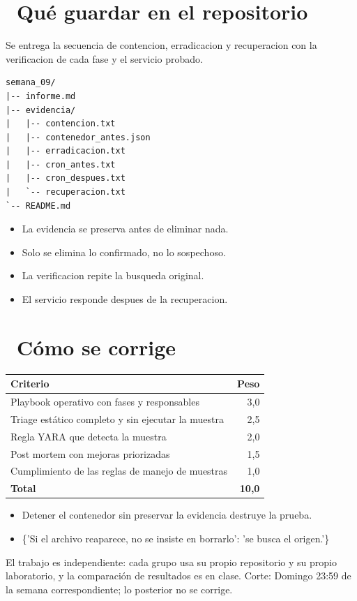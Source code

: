 \documentclass[11pt,a4paper]{article}
\newcommand{\iconotexto}[2]{\textcolor{cyanNeon}{\faIcon{#1}}~#2}
\begin{document}
\section{\iconotexto{box-open}{Qué guardar en el repositorio}}

Se entrega la secuencia de contencion, erradicacion y recuperacion con la verificacion de cada fase y el servicio probado.

\begin{lstlisting}[style=estiloCodigo]
semana_09/
|-- informe.md
|-- evidencia/
|   |-- contencion.txt
|   |-- contenedor_antes.json
|   |-- erradicacion.txt
|   |-- cron_antes.txt
|   |-- cron_despues.txt
|   `-- recuperacion.txt
`-- README.md
\end{lstlisting}

\begin{itemize}[leftmargin=1.4em,itemsep=2pt,topsep=3pt]
  \item La evidencia se preserva antes de eliminar nada.
  \item Solo se elimina lo confirmado, no lo sospechoso.
  \item La verificacion repite la busqueda original.
  \item El servicio responde despues de la recuperacion.
\end{itemize}

\section{\iconotexto{ruler-combined}{Cómo se corrige}}

\begin{tabularx}{\linewidth}{@{}X r@{}}
\toprule
Criterio & Peso\\
\midrule
Playbook operativo con fases y responsables & 3,0 \\
Triage estático completo y sin ejecutar la muestra & 2,5 \\
Regla YARA que detecta la muestra & 2,0 \\
Post mortem con mejoras priorizadas & 1,5 \\
Cumplimiento de las reglas de manejo de muestras & 1,0 \\
\midrule
\textbf{Total} & \textbf{10,0}\\
\bottomrule
\end{tabularx}

\begin{itemize}[leftmargin=1.4em,itemsep=2pt,topsep=3pt]
  \item Detener el contenedor sin preservar la evidencia destruye la prueba.
  \item \{'Si el archivo reaparece, no se insiste en borrarlo': 'se busca el origen.'\}
\end{itemize}

\begin{cajaRecuerda}El trabajo es independiente: cada grupo usa su propio repositorio y su propio laboratorio, y la comparación de resultados es en clase. Corte: Domingo 23:59 de la semana correspondiente; lo posterior no se corrige.
\end{cajaRecuerda}
\end{document}

